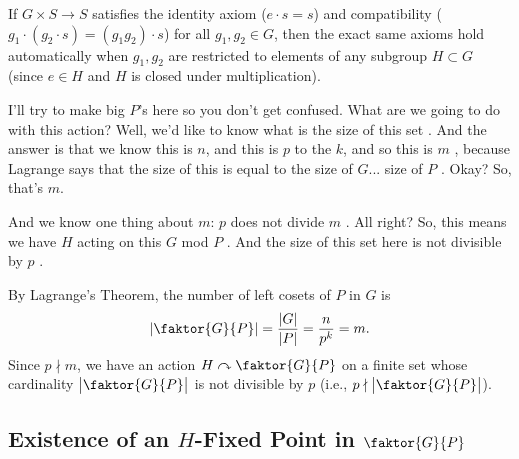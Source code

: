 \begin{proofWrapper}
\begin{content}
\begin{steps}
If $G \times S \to S$ satisfies the identity axiom ($e \cdot s = s$) and compatibility ($g_1 \cdot (g_2 \cdot s) = (g_1 g_2) \cdot s$) for all $g_1, g_2 \in G$, then the exact same axioms hold automatically when $g_1, g_2$ are restricted to elements of any subgroup $H \subset G$ (since $e \in H$ and $H$ is closed under multiplication).
\end{steps}
\end{content}

\begin{speech}[00:22:46 - 00:23:47]
I'll try to make big $P$'s here so you don't get confused. What are we going to do with this action? Well, we'd like to know what is the size of this set . And the answer is that we know this is $n$, and this is $p$ to the $k$, and so this is $m$ , because Lagrange says that the size of this is equal to the size of $G$... size of $P$ . Okay? So, that's $m$.

And we know one thing about $m$: $p$ does not divide $m$ . All right? So, this means we have $H$ acting on this $G$ mod $P$ . And the size of this set here is not divisible by $p$ .
\end{speech}

\begin{content}
By Lagrange's Theorem, the number of left cosets of $P$ in $G$ is
\begin{equation}\label{eq:coset-space-size}
\left|\faktor{G}{P}\right| = \frac{|G|}{|P|} = \frac{n}{p^k} = m.
\end{equation}
Since $p \nmid m$, we have an action $H \curvearrowright \faktor{G}{P}$ on a finite set whose cardinality $\bigl|\faktor{G}{P}\bigr|$ is not divisible by $p$ (i.e., $p \nmid \bigl|\faktor{G}{P}\bigr|$).
\end{content}

\subsection{Existence of an \texorpdfstring{$H$}{H}-Fixed Point in \texorpdfstring{$\faktor{G}{P}$}{G/P}}


\end{proofWrapper}
